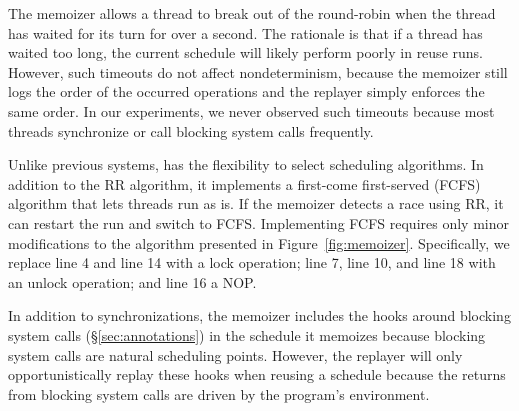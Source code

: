 The memoizer allows a thread to break out of the round-robin when the
thread has waited for its turn for over a second.  The rationale is that
if a thread has waited too long, the current schedule will likely
perform poorly in reuse runs.  However, such timeouts do not affect
nondeterminism, because the memoizer still logs the order of the occurred
operations and the replayer simply enforces the same order.  In our
experiments, we never observed such timeouts because most threads
synchronize or call blocking system calls frequently.

Unlike previous \dmt systems, \tern has the flexibility to select
scheduling algorithms.  In addition to the RR algorithm, it implements a
first-come first-served (FCFS) algorithm that lets threads run as is.  If
the memoizer detects a race using RR, it can restart the run and 
switch to FCFS.  Implementing
FCFS requires only minor modifications to the algorithm presented in
Figure~\ref{fig:memoizer}. Specifically, we replace line 4 and line 14
with a lock operation; line 7, line 10, and line 18 with an unlock
operation; and line 16 a NOP.



In addition to synchronizations, the memoizer includes the hooks around
blocking system calls (\S\ref{sec:annotations})
in the schedule it memoizes because blocking system calls are natural
scheduling points.  However, the replayer will only opportunistically
replay these hooks when reusing a schedule because the returns from
blocking system calls are driven by the program's environment.






